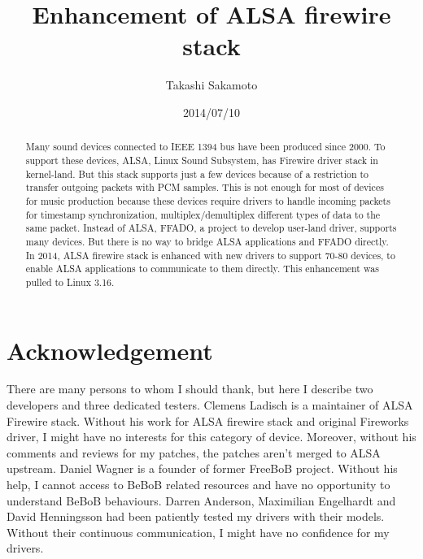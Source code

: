 \documentclass[onecolumn]{article}
\begin{document}

\title{Enhancement of ALSA firewire stack}
\author{Takashi Sakamoto}
\date{2014/07/10}
\maketitle{}

\begin{abstract}

Many sound devices connected to IEEE 1394 bus have been produced since 2000. To support these devices, ALSA, Linux Sound Subsystem, has Firewire driver stack in kernel-land. But this stack supports just a few devices because of a restriction to transfer outgoing packets with PCM samples. This is not enough for most of devices for music production because these devices require drivers to handle incoming packets for timestamp synchronization, multiplex/demultiplex different types of data to the same packet. Instead of ALSA, FFADO, a project to develop user-land driver, supports many devices. But there is no way to bridge ALSA applications and FFADO directly. In 2014, ALSA firewire stack is enhanced with new drivers to support 70-80 devices, to enable ALSA applications to communicate to them directly. This enhancement was pulled to Linux 3.16.

\end{abstract}

\section*{Acknowledgement}

There are many persons to whom I should thank, but here I describe two developers and three dedicated testers. Clemens Ladisch is a maintainer of ALSA Firewire stack. Without his work for ALSA firewire stack and original Fireworks driver, I might have no interests for this category of device. Moreover, without his comments and reviews for my patches, the patches aren't merged to ALSA upstream. Daniel Wagner is a founder of former FreeBoB project. Without his help, I cannot access to BeBoB related resources and have no opportunity to understand BeBoB behaviours. Darren Anderson, Maximilian Engelhardt and David Henningsson had been patiently tested my drivers with their models. Without their continuous communication, I might have no confidence for my drivers.

\newpage

\tableofcontents

\newpage
\end{document}
